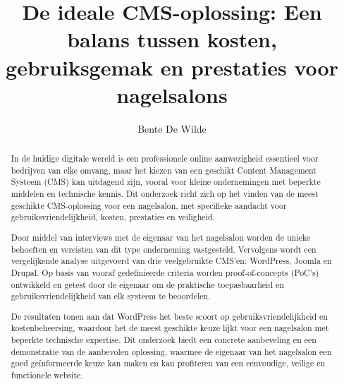 \documentclass{hogent-article}
\title{De ideale CMS-oplossing: Een balans tussen kosten, gebruiksgemak en prestaties voor nagelsalons}
\author{Bente De Wilde}
\begin{document}
\begin{abstract}
    In de huidige digitale wereld is een professionele online aanwezigheid essentieel voor bedrijven van elke omvang, maar het kiezen van een geschikt Content Management Systeem (CMS) kan uitdagend zijn, vooral voor kleine ondernemingen met beperkte middelen en technische kennis. Dit onderzoek richt zich op het vinden van de meest geschikte CMS-oplossing voor een nagelsalon, met specifieke aandacht voor gebruiksvriendelijkheid, kosten, prestaties en veiligheid.
    
    Door middel van interviews met de eigenaar van het nagelsalon worden de unieke behoeften en vereisten van dit type onderneming vastgesteld. Vervolgens wordt een vergelijkende analyse uitgevoerd van drie veelgebruikte CMS’en: WordPress, Joomla en Drupal. Op basis van vooraf gedefinieerde criteria worden proof-of-concepts (PoC’s) ontwikkeld en getest door de eigenaar om de praktische toepasbaarheid en gebruiksvriendelijkheid van elk systeem te beoordelen.
    
    De resultaten tonen aan dat WordPress het beste scoort op gebruiksvriendelijkheid en kostenbeheersing, waardoor het de meest geschikte keuze lijkt voor een nagelsalon met beperkte technische expertise. Dit onderzoek biedt een concrete aanbeveling en een demonstratie van de aanbevolen oplossing, waarmee de eigenaar van het nagelsalon een goed geïnformeerde keuze kan maken en kan profiteren van een eenvoudige, veilige en functionele website.
\end{abstract}

\tableofcontents



\printbibliography[heading=bibintoc]

\newpage
\appendix

\end{document}
